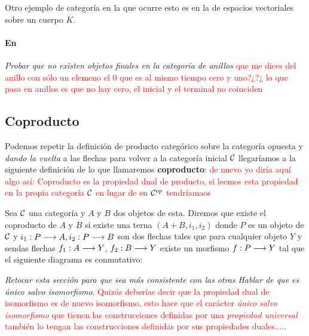 Otro ejemplo de categoría en la que ocurre esto es en la de espacios vectoriales
sobre un cuerpo $K$.

\paragraph{En \Ring}
\textit{Probar que no existen objetos finales en la categoría de anillos} \textcolor{red}{que me dices del anillo con sólo un elemeno el $0$ que es al mismo tiempo cero y uno?¿?¿ lo que pasa en anillos es que no hay cero, el inicial y el terminal no coinciden}

\subsection{Coproducto}
Podemos repetir la definición de producto categórico sobre la categoría
opuesta y \textit{dando la vuelta} a las flechas para volver a la
categoría inicial $\mathcal{C}$ llegaríamos a la siguiente definición de lo que
llamaremos \textbf{coproducto}: \textcolor{red}{de nuevo yo diría aquí algo así: Coproducto es la propiedad dual de producto, si leemos esta propiedad en la propia categoría $\mathcal{C}$ en lugar de en $\mathcal{C}^{op}$ tendríamaos}

\begin{definition}
Sea $\mathcal{C}$ una categoría y $A$ y $B$ dos objetos de esta. Diremos que
existe el coproducto de $A$ y $B$
si existe una terna $(A+B, i_1, i_2)$
donde $P$ es un objeto de $\mathcal{C}$ y
$i_1 : P\longrightarrow A, i_2 : P\longrightarrow B$ son dos flechas tales
que para cualquier objeto $Y$ y sendas flechas $f_1 : A\longrightarrow Y$,
$f_2 : B\longrightarrow Y$ existe un morfismo
$f : P\longrightarrow Y$ tal que el siguiente diagrama es conmutativo:
\begin{center}
\end{center}
\end{definition}

\textit{Retocar esta sección para que sea más consistente con las otras}
\textit{Hablar de que es único salvo isomorfismo}. \textcolor{red}{Quizás deberías decir que la propiedad dual de isomorfismo es de nuevo isomorfismo, esto hace que el carácter \emph{único salvo isomorfismo} que tienen las construcciones definidas por  una \emph{propiedad universal} también lo tengan las construcciones definidas por sus propiedades duales.....}


